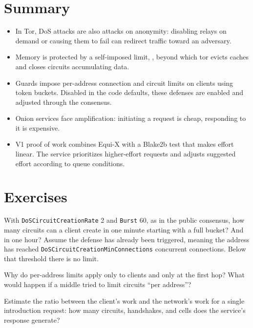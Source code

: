 \section*{Summary}
\begin{itemize}
  \item In Tor, DoS attacks are also attacks on anonymity: disabling relays on demand or causing them to fail can redirect traffic toward an adversary.
  \item Memory is protected by a self-imposed limit, , beyond which tor evicts caches and closes circuits accumulating data.
  \item Guards impose per-address connection and circuit limits on clients using token buckets. Disabled in the code defaults, these defenses are enabled and adjusted through the consensus.
  \item Onion services face amplification: initiating a request is cheap, responding to it is expensive.
  \item V1 proof of work combines Equi-X with a Blake2b test that makes effort linear. The service prioritizes higher-effort requests and adjusts suggested effort according to queue conditions.
\end{itemize}

\section*{Exercises}

\begin{esercizio}[1]\label{es:15-bucket}
With \texttt{DoSCircuitCreationRate} 2 and \texttt{Burst} 60, as in the public consensus, how many circuits can a client create in one minute starting with a full bucket? And in one hour? Assume the defense has already been triggered, meaning the address has reached \texttt{DoSCircuitCreationMinConnections} concurrent connections. Below that threshold there is no limit.
\end{esercizio}

\begin{esercizio}[1]\label{es:15-guard}
Why do per-address limits apply only to clients and only at the first hop? What would happen if a middle tried to limit circuits \enquote{per address}?
\end{esercizio}

\begin{esercizio}[2]\label{es:15-amplificazione}
Estimate the ratio between the client's work and the network's work for a single introduction request: how many circuits, handshakes, and cells does the service's response generate?
\end{esercizio}

